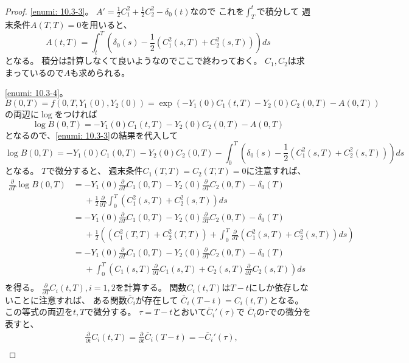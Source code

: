 \documentclass[uplatex]{jsarticle}
\theoremstyle{definition}
\begin{document}
\begin{proof}
  \ref{enumi: 10.3-3}。
  \(A' = \frac{1}{2}C_1^2 + \frac{1}{2}C_2^2 - \delta_0(t)\)なので
  これを\(\int_T^t\)で積分して
  週末条件\(A(T,T)=0\)を用いると、
  \[
  A(t,T) = \int_t^T \left( \delta_0(s)
  - \frac{1}{2}\left( C_1^2(s,T) + C_2^2(s,T) \right)\right)ds
  \]
  となる。
  積分は計算しなくて良いようなのでここで終わっておく。
  \(C_1,C_2\)は求まっているので\(A\)も求められる。

  \ref{enumi: 10.3-4}。
  \[
  B(0,T) = f(0,T,Y_1(0),Y_2(0))
  = \exp\left( -Y_1(0)C_1(t,T)-Y_2(0)C_2(0,T)-A(0,T)\right)
  \]
  の両辺に\(\log\)をつければ
  \[
  \log B(0,T) = -Y_1(0)C_1(t,T)-Y_2(0)C_2(0,T)-A(0,T)
  \]
  となるので、\ref{enumi: 10.3-3}の結果を代入して
  \[
  \log B(0,T) = -Y_1(0)C_1(0,T)-Y_2(0)C_2(0,T)-
  \int_0^T \left( \delta_0(s)
  - \frac{1}{2}\left( C_1^2(s,T) + C_2^2(s,T) \right)\right)ds
  \]
  となる。
  \(T\)で微分すると、
  週末条件\(C_1(T,T)=C_2(T,T)=0\)に注意すれば、
  \begin{align*}
    \frac{\partial}{\partial T}\log B(0,T)
    &= - Y_1(0)\frac{\partial}{\partial T}C_1(0,T)
    - Y_2(0)\frac{\partial}{\partial T}C_2(0,T) - \delta_0(T) \\
    &\ \ \ \ \ \
    + \frac{1}{2}\frac{\partial}{\partial T}\int_0^T
    \left(C_1^2(s,T) + C_2^2(s,T)\right) ds \\
    &= - Y_1(0)\frac{\partial}{\partial T}C_1(0,T)
    - Y_2(0)\frac{\partial}{\partial T}C_2(0,T) - \delta_0(T) \\
    &\ \ \ \ \ \
    + \frac{1}{2}\left( \left(C_1^2(T,T) + C_2^2(T,T)\right)
    + \int_0^T \frac{\partial}{\partial T}
    \left(C_1^2(s,T) + C_2^2(s,T)\right) ds \right) \\
    &= - Y_1(0)\frac{\partial}{\partial T}C_1(0,T)
    - Y_2(0)\frac{\partial}{\partial T}C_2(0,T) - \delta_0(T) \\
    &\ \ \ \ \ \
    + \int_0^T \left( C_1(s,T)\frac{\partial}{\partial T} C_1(s,T)
    + C_2(s,T)\frac{\partial}{\partial T} C_2(s,T)\right) ds \\
  \end{align*}
  を得る。
  \(\frac{\partial}{\partial T}C_i(t,T) , i=1,2\)を計算する。
  関数\(C_i(t,T)\)は\(T-t\)にしか依存しないことに注意すれば、
  ある関数\(\bar{C}_i\)が存在して
  \(\bar{C}_i(T-t) = C_i(t,T)\)となる。
  この等式の両辺を\(t,T\)で微分する。
  \(\tau = T-t\)とおいて\(\bar{C}_i'(\tau)\)で
  \(\bar{C}_i\)の\(\tau\)での微分を表すと、
  \begin{align*}
    &\frac{\partial}{\partial t}C_i(t,T)
    = \frac{\partial}{\partial t}\bar{C}_i(T-t)
    = -\bar{C}_i'(\tau), \\

\end{align*}
\end{proof}
\end{document}
